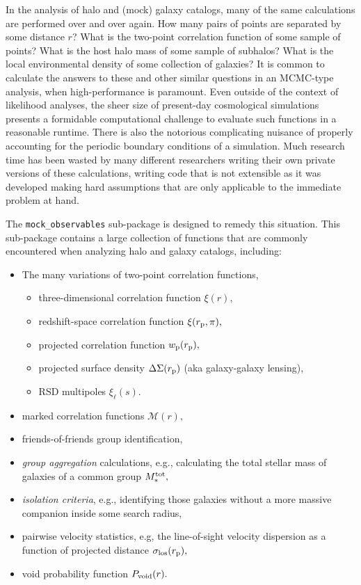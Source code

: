 \documentclass[twocolumn, tighten]{aastex6}
\newcommand{\bit}{\begin{itemize}}
\newcommand{\eit}{\end{itemize}}
\newcommand{\rproj}{r_{\rm p}}
\begin{document}
In the analysis of halo and (mock) galaxy catalogs, many of the same calculations are performed over and over again. How many pairs of points are separated by some distance $r$? What is the two-point correlation function of some sample of points? What is the host halo mass of some sample of subhalos? What is the local environmental density of some collection of galaxies? It is common to calculate the answers to these and other similar questions in an MCMC-type analysis, when high-performance is paramount. Even outside of the context of likelihood analyses, the sheer size of present-day cosmological simulations presents a formidable computational challenge to evaluate such functions in a reasonable runtime. There is also the notorious complicating nuisance of properly accounting for the periodic boundary conditions of a simulation. Much research time has been wasted by many different researchers writing their own private versions of these calculations, writing code that is not extensible as it was developed making hard assumptions that are only applicable to the immediate problem at hand. 

The {\tt mock\_observables} sub-package is designed to remedy this situation. This sub-package contains a large collection of functions that are commonly encountered when analyzing halo and galaxy catalogs, including:

\bit
\item The many variations of two-point correlation functions, 
\bit
\item three-dimensional correlation function $\xi(r),$ 
\item redshift-space correlation function $\xi(\rproj, \pi),$
\item projected correlation function $w_{\rm p}(\rproj),$
\item projected surface density $\Delta\Sigma(r_{\rm p})$ (aka galaxy-galaxy lensing),
\item RSD multipoles $\xi_{\ell}(s).$
\eit
\item marked correlation functions $\mathcal{M}(r),$
\item friends-of-friends group identification,
\item {\em group aggregation} calculations, e.g., calculating the total stellar mass of galaxies of a common group $M_{\ast}^{\rm tot},$
\item {\em isolation criteria}, e.g., identifying those galaxies without a more massive companion inside some search radius, 
\item pairwise velocity statistics, e.g, the line-of-sight velocity dispersion as a function of projected distance $\sigma_{\rm los}(\rproj),$
\item void probability function $P_{\rm void}(r).$
\eit
\end{document}
